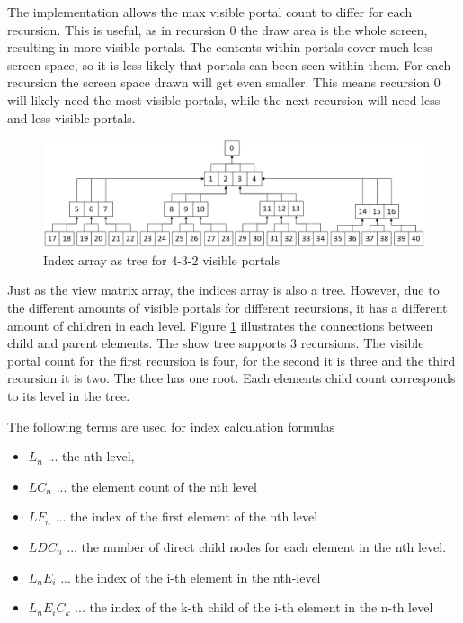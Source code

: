 The implementation allows the max visible portal count to differ for each recursion. This is useful, as in recursion 0 the draw area is the whole screen, resulting in more visible portals. The contents within portals cover much less screen space, so it is less likely that portals can been seen within them. For each recursion the screen space drawn will get even smaller. This means recursion 0 will likely need the most visible portals, while the next recursion will need less and less visible portals.

\begin{figure}[h]
	\includegraphics[width=\linewidth]{images/indexarray.png}
	\caption{Index array as tree for 4-3-2 visible portals}
	\label{fig:indexarray}
\end{figure}

Just as the view matrix array, the indices array is also a tree. However, due to the different amounts of visible portals for different recursions, it has a different amount of children in each level. Figure \ref{fig:indexarray} illustrates the connections between child and parent elements. The show tree supports 3 recursions. The visible portal count for the first recursion is four, for the second it is three and the third recursion it is two. The thee has one root. Each elements child count corresponds to its level in the tree.

The following terms are used for index calculation formulas
\begin{itemize}
	\item $L_n$ ... the nth level,
	\item $LC_n$ ... the element count of the nth level
	\item $LF_n$ ... the index of the first element of the nth level
	\item $LDC_n$ ... the number of direct child nodes for each element in the nth level. 
	\item $L_nE_i$ ... the index of the i-th element in the nth-level
	\item $L_nE_iC_k$ ... the index of the k-th child of the i-th element in the n-th level 
\end{itemize}

